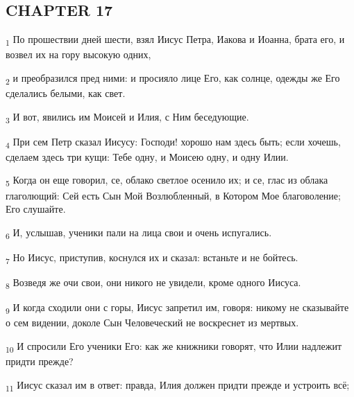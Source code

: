 \subsection{CHAPTER 17}
\begin{tcolorbox}
\textsubscript{1} По прошествии дней шести, взял Иисус Петра, Иакова и Иоанна, брата его, и возвел их на гору высокую одних,
\end{tcolorbox}
\begin{tcolorbox}
\textsubscript{2} и преобразился пред ними: и просияло лице Его, как солнце, одежды же Его сделались белыми, как свет.
\end{tcolorbox}
\begin{tcolorbox}
\textsubscript{3} И вот, явились им Моисей и Илия, с Ним беседующие.
\end{tcolorbox}
\begin{tcolorbox}
\textsubscript{4} При сем Петр сказал Иисусу: Господи! хорошо нам здесь быть; если хочешь, сделаем здесь три кущи: Тебе одну, и Моисею одну, и одну Илии.
\end{tcolorbox}
\begin{tcolorbox}
\textsubscript{5} Когда он еще говорил, се, облако светлое осенило их; и се, глас из облака глаголющий: Сей есть Сын Мой Возлюбленный, в Котором Мое благоволение; Его слушайте.
\end{tcolorbox}
\begin{tcolorbox}
\textsubscript{6} И, услышав, ученики пали на лица свои и очень испугались.
\end{tcolorbox}
\begin{tcolorbox}
\textsubscript{7} Но Иисус, приступив, коснулся их и сказал: встаньте и не бойтесь.
\end{tcolorbox}
\begin{tcolorbox}
\textsubscript{8} Возведя же очи свои, они никого не увидели, кроме одного Иисуса.
\end{tcolorbox}
\begin{tcolorbox}
\textsubscript{9} И когда сходили они с горы, Иисус запретил им, говоря: никому не сказывайте о сем видении, доколе Сын Человеческий не воскреснет из мертвых.
\end{tcolorbox}
\begin{tcolorbox}
\textsubscript{10} И спросили Его ученики Его: как же книжники говорят, что Илии надлежит придти прежде?
\end{tcolorbox}
\begin{tcolorbox}
\textsubscript{11} Иисус сказал им в ответ: правда, Илия должен придти прежде и устроить всё;
\end{tcolorbox}
